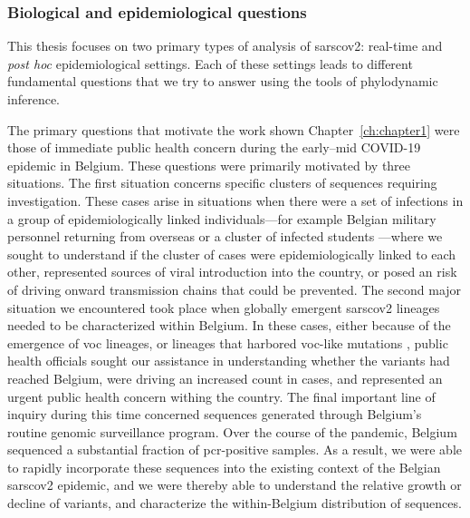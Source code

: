 \subsubsection{Biological and epidemiological questions}
This thesis focuses on two primary types of analysis of \gls{sarscov2}: real-time and \textit{post hoc} epidemiological settings.
Each of these settings leads to different fundamental questions that we try to answer using the tools of phylodynamic inference.

The primary questions that motivate the work shown Chapter~\ref{ch:chapter1} were those of immediate public health concern during the early--mid COVID-19 epidemic in Belgium.
These questions were primarily motivated by three situations. 
The first situation concerns specific clusters of sequences requiring investigation.
These cases arise in situations when there were a set of infections in a group of epidemiologically linked individuals---for example Belgian military personnel returning from overseas \citep{pirnay2020study} or a cluster of infected students \citep{vanelslande2022two}---where we sought to understand if the cluster of cases were epidemiologically linked to each other, represented sources of viral introduction into the country, or posed an risk of driving onward transmission chains that could be prevented.
The second major situation we encountered took place when globally emergent \gls{sarscov2} lineages needed to be characterized within Belgium.
In these cases, either because of the emergence of \gls{voc} lineages, or lineages that harbored \gls{voc}-like mutations \citep{dudas2021emergence}, public health officials sought our assistance in understanding whether the variants had reached Belgium, were driving an increased count in cases, and represented an urgent public health concern withing the country.
The final important line of inquiry during this time concerned sequences generated through Belgium's routine genomic surveillance program.
Over the course of the pandemic, Belgium sequenced a substantial fraction of \gls{pcr}-positive samples.
As a result, we were able to rapidly incorporate these sequences into the existing context of the Belgian \gls{sarscov2} epidemic, and we were thereby able to understand the relative growth or decline of variants, and characterize the within-Belgium distribution of sequences.

